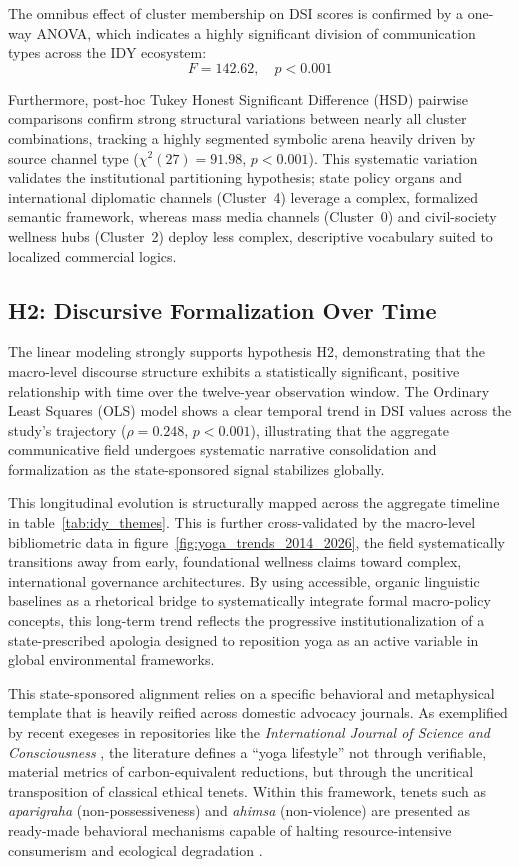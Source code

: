 \documentclass[11pt]{article}
\begin{document}
The omnibus effect of cluster membership on DSI scores is confirmed by a one-way ANOVA, which indicates a highly significant division of communication types across the IDY ecosystem:
\begin{equation}
    F = 142.62, \quad p < 0.001
\end{equation}

Furthermore, post-hoc Tukey Honest Significant Difference (HSD) pairwise comparisons confirm strong structural variations between nearly all cluster combinations, tracking a highly segmented symbolic arena heavily driven by source channel type ($\chi^2(27) = 91.98$, $p < 0.001$). This systematic variation validates the institutional partitioning hypothesis; state policy organs and international diplomatic channels (Cluster~4) leverage a complex, formalized semantic framework, whereas mass media channels (Cluster~0) and civil-society wellness hubs (Cluster~2) deploy less complex, descriptive vocabulary suited to localized commercial logics.

\subsection{H2: Discursive Formalization Over Time}
The linear modeling strongly supports hypothesis H2, demonstrating that the macro-level discourse structure exhibits a statistically significant, positive relationship with time over the twelve-year observation window. The Ordinary Least Squares (OLS) model shows a clear temporal trend in DSI values across the study's trajectory ($\rho = 0.248$, $p < 0.001$), illustrating that the aggregate communicative field undergoes systematic narrative consolidation and formalization as the state-sponsored signal stabilizes globally. 

This longitudinal evolution is structurally mapped across the aggregate timeline in {table~\ref{tab:idy_themes}}. This is further cross-validated by the macro-level bibliometric data in figure~\ref{fig:yoga_trends_2014_2026}, the field systematically transitions away from early, foundational wellness claims toward complex, international governance architectures. By using accessible, organic linguistic baselines as a rhetorical bridge to systematically integrate formal macro-policy concepts, this long-term trend reflects the progressive institutionalization of a state-prescribed apologia designed to reposition yoga as an active variable in global environmental frameworks.

This state-sponsored alignment relies on a specific behavioral and metaphysical template that is heavily reified across domestic advocacy journals. As exemplified by recent exegeses in repositories like the \textit{International Journal of Science and Consciousness} \cite{nidhishree2026naturopathy}, the literature defines a ``yoga lifestyle'' not through verifiable, material metrics of carbon-equivalent reductions, but through the uncritical transposition of classical ethical tenets. Within this framework, tenets such as \textit{aparigraha} (non-possessiveness) and \textit{ahimsa} (non-violence) are presented as ready-made behavioral mechanisms capable of halting resource-intensive consumerism and ecological degradation \cite{nidhishree2026naturopathy}.
\end{document}
